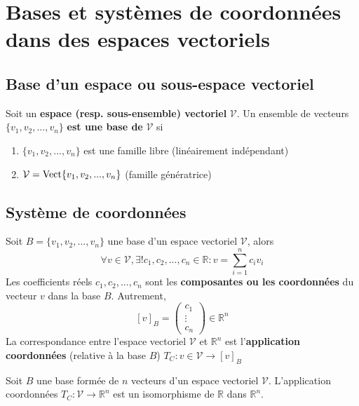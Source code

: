 \section{Bases et systèmes de coordonnées dans des espaces vectoriels}
	\subsection{Base d'un espace ou sous-espace vectoriel}
		\begin{mydef}
			Soit un \textbf{espace (resp. sous-ensemble) vectoriel} $\mathcal{V}$.
			Un ensemble de vecteurs $\{v_1,v_2,...,v_n\}$ \textbf{est une base de} $\mathcal{V}$ si
			\begin{enumerate}
				\item  $\{v_1,v_2,...,v_n\}$ est une famille libre (linéairement indépendant)
				\item $\mathcal{V} = \text{\normalfont{Vect}}\{v_1,v_2,...,v_n\}$ (famille génératrice)
			\end{enumerate}
		\end{mydef}
	\subsection{Système de coordonnées}
		\begin{mythm}
			Soit $B=\{v_1,v_2,...,v_n\}$ une base d'un espace vectoriel $\mathcal{V}$, alors
			\[\forall v\in\mathcal{V},\exists!c_1,c_2,...,c_n\in\mathbb{R} : v = \sum_{i=1}^{n}c_iv_i\]
			Les coefficients réels $c_1,c_2,...,c_n$ sont les \textbf{composantes ou les coordonnées} du vecteur $v$ dans la base $B$. Autrement,\[[v]_B=\begin{pmatrix}
			c_1\\ \vdots \\ c_n
			\end{pmatrix}\in\mathbb{R}^n\]
			La correspondance entre l'espace vectoriel $\mathcal{V}$ et $\mathbb{R}^n$ est l'\textbf{application coordonnées} (relative à la base $B$) $T_C : v\in\mathcal{V}\longrightarrow [v]_B$
		\end{mythm}
		\begin{mythm}
			\index{Isomorphisme}
			Soit $B$ une base formée de $n$ vecteurs d'un espace vectoriel $\mathcal{V}$. L'application coordonnées $T_C : \mathcal{V}\longrightarrow\mathbb{R}^n$ est un isomorphisme de $\mathbb{R}$ dans $\mathbb{R}^n$.
		\end{mythm}
